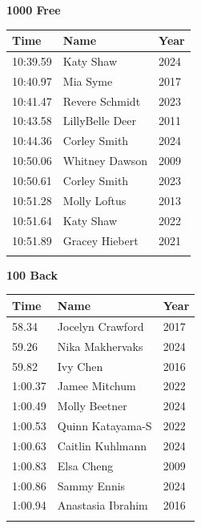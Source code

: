 \vspace{1.2em}
\noindent\begin{minipage}[t]{0.48\textwidth}
\centering
\textbf{\textcolor{teamprimary}{1000 Free}}\par
\vspace{0.5em}
\centering
\small
\renewcommand{\arraystretch}{1.0}
\setlength{\tabcolsep}{4pt}
\begin{tabular}{@{}p{1.8cm}p{3.0cm}p{1.0cm}@{}}
\toprule
\textbf{Time} & \textbf{Name} & \textbf{Year} \\
\midrule
10:39.59 & Katy Shaw & 2024 \\
10:40.97 & Mia Syme & 2017 \\
10:41.47 & Revere Schmidt & 2023 \\
10:43.58 & LillyBelle Deer & 2011 \\
10:44.36 & Corley Smith & 2024 \\
10:50.06 & Whitney Dawson & 2009 \\
10:50.61 & Corley Smith & 2023 \\
10:51.28 & Molly Loftus & 2013 \\
10:51.64 & Katy Shaw & 2022 \\
10:51.89 & Gracey Hiebert & 2021 \\
\bottomrule
\vspace{0.5em}
\end{tabular}
\end{minipage}
\hfill
\begin{minipage}[t]{0.48\textwidth}
\centering
\textbf{\textcolor{teamprimary}{100 Back}}\par
\vspace{0.5em}
\centering
\small
\renewcommand{\arraystretch}{1.0}
\setlength{\tabcolsep}{4pt}
\begin{tabular}{@{}p{1.8cm}p{3.0cm}p{1.0cm}@{}}
\toprule
\textbf{Time} & \textbf{Name} & \textbf{Year} \\
\midrule
58.34 & Jocelyn Crawford & 2017 \\
59.26 & Nika Makhervaks & 2024 \\
59.82 & Ivy Chen & 2016 \\
1:00.37 & Jamee Mitchum & 2022 \\
1:00.49 & Molly Beetner & 2024 \\
1:00.53 & Quinn Katayama-S & 2022 \\
1:00.63 & Caitlin Kuhlmann & 2024 \\
1:00.83 & Elsa Cheng & 2009 \\
1:00.86 & Sammy Ennis & 2024 \\
1:00.94 & Anastasia Ibrahim & 2016 \\
\bottomrule
\vspace{0.5em}
\end{tabular}
\end{minipage}
